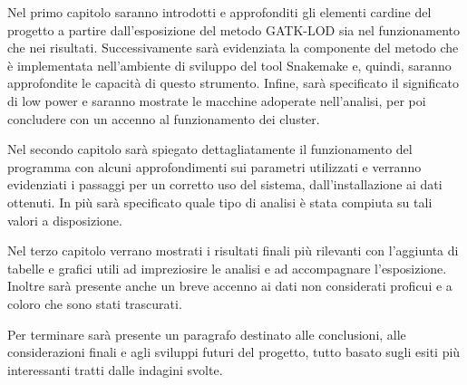 \documentclass[12pt, a4paper]{report}
\begin{document}
Nel primo capitolo saranno introdotti e approfonditi gli elementi cardine del progetto a partire dall'esposizione del metodo GATK-LOD sia nel funzionamento che nei risultati.
Successivamente sarà evidenziata la componente del metodo che è implementata nell'ambiente di sviluppo del tool Snakemake e, quindi, saranno approfondite le capacità di questo strumento.
Infine, sarà specificato il significato di low power e saranno mostrate le macchine adoperate nell'analisi, per poi concludere con un accenno al funzionamento dei cluster.

Nel secondo capitolo sarà spiegato dettagliatamente il funzionamento del programma con alcuni approfondimenti sui parametri utilizzati e verranno evidenziati i passaggi per un corretto uso del sistema, dall'installazione ai dati ottenuti.
In più sarà specificato quale tipo di analisi è stata compiuta su tali valori a disposizione.

Nel terzo capitolo verrano mostrati i risultati finali più rilevanti con l'aggiunta di tabelle e grafici utili ad impreziosire le analisi e ad accompagnare l'esposizione.
Inoltre sarà presente anche un breve accenno ai dati non considerati proficui e a coloro che sono stati trascurati.

Per terminare sarà presente un paragrafo destinato alle conclusioni, alle considerazioni finali e agli sviluppi futuri del progetto, tutto basato sugli esiti più interessanti tratti dalle indagini svolte.



\end{document}
